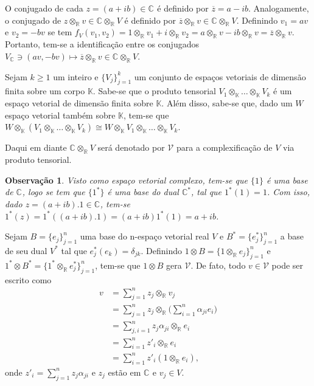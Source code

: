 \documentclass[12pt]{book}
\newtheorem{observacao}[teorema]{Observação}
\newcommand{\bigparenteses}[1]{\Big( #1 \Big) }
\newcommand{\colecaofinita}[2]{\{#1_{j} \}_{j=1}^{#2}}
\newcommand{\complexificacao}[1]{#1_{\complexo{}}}
\newcommand{\complexificacaotensorial}[1]{\complexo{}\otimes_{\reta} #1}
\newcommand{\complexificado}[1]{\mathcal{#1}}
\newcommand{\complexificacaoelemento}[2]{#1\otimes_{\reta} #2}
\newcommand{\complexo}[1]{\mathbb{C}^{#1}}
\newcommand{\produtotensorial}[2]{ #1_{1} \otimes_{\mathbb{K}} \dots \otimes_{\mathbb{K}} #1_{#2}}
\newcommand{\real}[1]{\mathbb{R}^{#1}}
\newcommand{\reta}{\real{}}
\begin{document}
	O conjugado de cada $z=(a+ib) \in \complexo{}$ é definido por $\overline{z} = a-ib$. Analogamente, o conjugado de $\complexificacaoelemento{z}{v} \in \complexificacaotensorial{V}$ é definido por $\complexificacaoelemento{\overline{z}}{v} \in \complexificacaotensorial{V}$. Definindo $v_{1} =av$ e $v_{2} = -bv$ se tem $f_{V}(v_{1}, v_{2}) =\complexificacaoelemento{1}{v_{1}} +\complexificacaoelemento{i}{v_{2}} = \complexificacaoelemento{a}{v} -\complexificacaoelemento{ib}{v}  =\complexificacaoelemento{\overline{z}}{v}  $. Portanto, tem-se a identificação entre os conjugados $ \complexificacao{V} \ni (av, -bv) \mapsto \complexificacaoelemento{\overline{z}}{v} \in \complexificacaotensorial{V}$.
	
	Sejam $k\geq 1$ um inteiro e $\{V_{j}\}_{j=1}^{k}$ um conjunto de espaços vetoriais de dimensão finita sobre um corpo $\mathbb{K}$. Sabe-se que o produto tensorial $\produtotensorial{V}{k}$ é um espaço vetorial de dimensão finita sobre $\mathbb{K}$. Além disso, sabe-se que, dado um $W$ espaço vetorial também sobre $\mathbb{K}$, tem-se que $W\otimes_{\mathbb{K}}(\produtotensorial{V}{k}) \cong W\otimes_{\mathbb{K}} \produtotensorial{V}{k}$. 
	
	Daqui em diante $ \complexificacaotensorial{V}$ será denotado por $\complexificado{V}$ para a complexificação de $V$ via produto tensorial.
	
	\begin{observacao}
		Visto como espaço vetorial complexo, tem-se que $\{1\}$ é uma base de $\complexo{}$, logo se tem que $\{1^{*}\}$ é uma base do dual $\complexo{*}$, tal que $1^{*}(1) = 1$. Com isso, dado $z = (a+ib).1 \in \complexo{}$, tem-se $1^{*}(z) = 1^{*}((a+ib).1) = (a+ib)1^{*}(1) = a+ib$.
	\end{observacao}
	
	Sejam $B = \colecaofinita{e}{n}$ uma base do n-espaço vetorial real $V$ e $B^{*} = \colecaofinita{e^{*}}{n}$ a base de seu dual $V^{*}$ tal que $e^{*}_{j}(e_{k}) =\delta_{jk}$. Definindo $1 \otimes B = \colecaofinita{\complexificacaoelemento{1}{e}}{n}$ e
	$1^{*} \otimes B^{*} = \colecaofinita{\complexificacaoelemento{1^{*}}{e^{*}}}{n}$, tem-se que $1\otimes B$ gera $\complexificado{V}$. De fato, todo $v \in \complexificado{V}$ pode ser escrito como 
	$$
	\begin{aligned}
	v &= \sum_{j=1}^{n} \complexificacaoelemento{z_{j}}{v_{j}}
	\\
	&= \sum_{j=1}^{n} \complexificacaoelemento{z_{j}}{\bigparenteses{\sum_{i=1}^{n}\alpha_{ji}e_{i}}} 
	\\
	&= \sum_{j,i=1}^{n}\complexificacaoelemento{z_{j}\alpha_{ji}}{e_{i}}
	\\
	&= \sum_{i=1}^{n}\complexificacaoelemento{z'_{i}}{e_{i}}
	\\
	&= \sum_{i=1}^{n}z'_{i}(\complexificacaoelemento{1}{e_{i}}),
	\end{aligned}
	$$
	onde $z'_{i} = \sum_{j=1}^{n}z_{j}\alpha_{ji}$ e $ z_{j}$ estão em $\complexo{}$ e $v_{j} \in V$.
	
\end{document}
